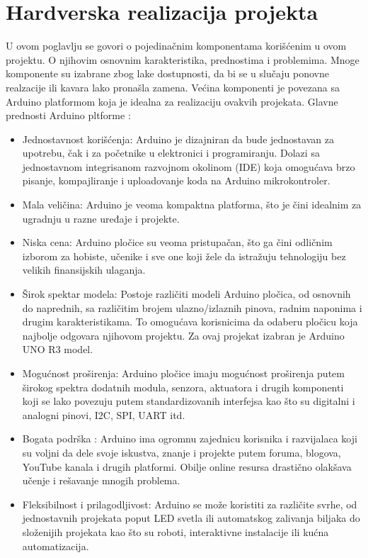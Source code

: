 \documentclass[a4paper, 12pt]{article}
\begin{document}
\pagebreak
\endgroup

\begingroup
\justifying
\section{Hardverska realizacija projekta}

\vspace{10pt}

U ovom poglavlju se govori o pojedinačnim komponentama korišćenim u ovom projektu. O njihovim osnovnim karakteristika, prednostima i problemima. Mnoge komponente su izabrane zbog lake dostupnosti, da bi se u slučaju ponovne realzacije ili kavara lako pronašla zamena. Većina komponenti je povezana sa Arduino platformom koja je idealna za realizaciju ovakvih projekata. Glavne prednosti Arduino pltforme :

	\begin{itemize}
	
		\item Jednostavnost korišćenja: Arduino je dizajniran da bude jednostavan za upotrebu, čak i za početnike u elektronici i programiranju. Dolazi sa jednostavnom integrisanom razvojnom okolinom (IDE) koja omogućava brzo pisanje, kompajliranje i uploadovanje koda na Arduino mikrokontroler.
		\item Mala veličina: Arduino je veoma kompaktna platforma, što je čini idealnim za ugradnju u razne uređaje i projekte.
		\sloppypar
        \item Niska cena: Arduino pločice su veoma pristupačan, što ga čini odličnim izborom za hobiste, učenike i sve one koji žele da istražuju tehnologiju bez velikih finansijskih ulaganja.
        \item Širok spektar modela: Postoje različiti modeli Arduino pločica, od osnovnih do naprednih, sa različitim brojem ulazno/izlaznih pinova, radnim naponima i drugim karakteristikama. To omogućava korisnicima da odaberu pločicu koja najbolje odgovara njihovom projektu. Za ovaj projekat izabran je Arduino UNO R3 model.
        \item Mogućnost proširenja: Arduino pločice imaju mogućnost proširenja putem širokog spektra dodatnih modula, senzora, aktuatora i drugih komponenti koji se lako povezuju putem standardizovanih interfejsa kao što su digitalni i analogni pinovi, I2C, SPI, UART itd.
        \item Bogata podrška : Arduino ima ogromnu zajednicu korisnika i razvijalaca koji su voljni da dele svoje iskustva, znanje i projekte putem foruma, blogova, YouTube kanala i drugih platformi. Obilje  online resursa drastično olakšava učenje i rešavanje mnogih problema.
        \item Fleksibilnost i prilagodljivost: Arduino se može koristiti za različite svrhe, od jednostavnih projekata poput LED svetla ili automatskog zalivanja biljaka do složenijih projekata kao što su roboti, interaktivne instalacije ili kućna automatizacija. 
       
	\end{itemize}
\end{document}
